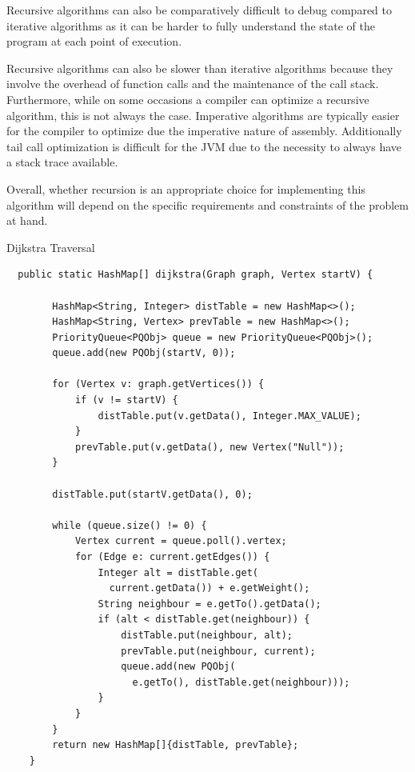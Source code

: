\documentclass[a4paper]{article}
\begin{document}
Recursive algorithms can also be comparatively difficult to debug compared to iterative algorithms as
it can be harder to fully understand the state of the program at each point of execution. \\
\vspace{4mm}

Recursive algorithms can also be slower than iterative algorithms because they involve the overhead of function calls and the maintenance of the call stack.
Furthermore, while on some occasions a compiler can optimize a recursive algorithm, this is not always the case. 
Imperative algorithms are typically 
easier for the compiler to optimize due the imperative nature of assembly.
Additionally tail call optimization is difficult for the JVM due to the necessity to always have a stack trace available. \\
\vspace{4mm}

Overall, whether recursion is an appropriate choice for implementing this algorithm will depend on 
the specific requirements and constraints of the problem at hand. \\
\newpage
\begin{algorithm}
\caption{Dijkstra Traversal}\label{euclid}

\begin{verbatim}
  public static HashMap[] dijkstra(Graph graph, Vertex startV) {

        HashMap<String, Integer> distTable = new HashMap<>();
        HashMap<String, Vertex> prevTable = new HashMap<>();
        PriorityQueue<PQObj> queue = new PriorityQueue<PQObj>();
        queue.add(new PQObj(startV, 0));

        for (Vertex v: graph.getVertices()) {
            if (v != startV) {
                distTable.put(v.getData(), Integer.MAX_VALUE);
            }
            prevTable.put(v.getData(), new Vertex("Null"));
        }

        distTable.put(startV.getData(), 0);

        while (queue.size() != 0) {
            Vertex current = queue.poll().vertex;
            for (Edge e: current.getEdges()) {
                Integer alt = distTable.get(
                  current.getData()) + e.getWeight();
                String neighbour = e.getTo().getData();
                if (alt < distTable.get(neighbour)) {
                    distTable.put(neighbour, alt);
                    prevTable.put(neighbour, current);
                    queue.add(new PQObj(
                      e.getTo(), distTable.get(neighbour)));
                }
            }
        }
        return new HashMap[]{distTable, prevTable};
    }
\end{verbatim}
\end{algorithm}
\vspace{7mm}
\end{document}
